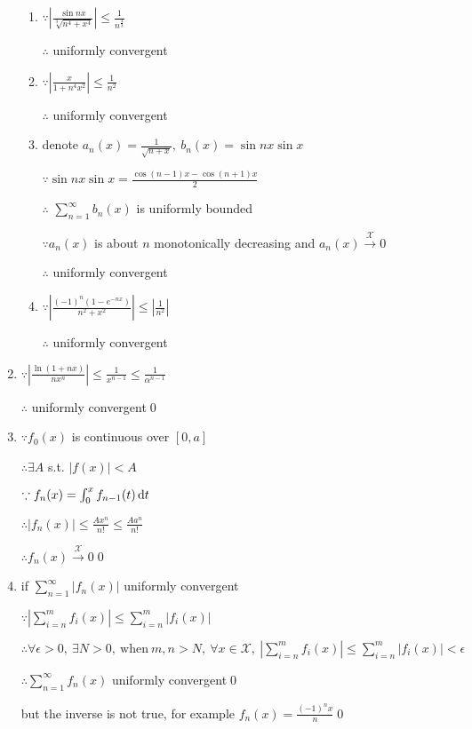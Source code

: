 \begin{enumerate}[1]
\begin{enumerate}[(1)]
        \item $\because \left|\frac{\sin n x}{\sqrt[3]{n^{4}+x^{4}}}\right| \leq \frac{1}{n^{\frac{4}{3}}}$
        \par $\therefore $ uniformly convergent

        \item $\because \left|\frac{x}{1+n^{4} x^{2}}\right| \leq \frac{1}{n^{2}}$
        \par $\therefore $ uniformly convergent

        \item denote $ a_{n}(x)=\frac{1}{\sqrt{n+x}},\ b_{n}(x)=\sin nx \sin x$
        \par  $\because \sin n x \sin x=\frac{\cos (n-1) x-\cos (n+1) x}{2}$ 
        \par $\therefore $ $\sum\limits_{n=1}^{\infty}b_n(x)$ is uniformly bounded
        \par $\because a_n(x)$ is about $n$ monotonically decreasing and $ a_{n}(x) \stackrel{\mathcal{X}}{\longrightarrow} 0$
        \par $\therefore $  uniformly convergent

        \item $\because \left|\frac{(-1)^{n}\left(1-e^{-n x}\right)}{n^{2}+x^{2}}\right| \leq\left|\frac{1}{n^{2}}\right|$
        \par $\therefore $ uniformly convergent
        \end{enumerate}

    \item $\because \left|\frac{\ln (1+n x)}{n x^{n}}\right| \leq \frac{1}{x^{n-1}} \leq \frac{1}{\alpha^{n-1}}$
    \par $\therefore $ uniformly convergent\qed

    \item   
    $\because f_0(x)$ is continuous over $[0,a]$
    \par $\therefore \exists A$ s.t. $|f(x)|<A$
    \par $\because f_{n}(x)=\int_{0}^{x} f_{n-1}(t)\dif t$ 
    \par $\therefore \left|f_{n}(x)\right| \leq \frac{A x^{n}}{n !} \leq \frac{A a^{n}}{n !}$
    \par $\therefore  f_n(x) \stackrel{\mathcal{X}}{\longrightarrow} 0$\qed

    \item 
    if $\sum \limits_{n=1}^{\infty} \left|f_{n}(x)\right|$ uniformly convergent
    \par $\because \left|\sum \limits_{i=n}^{m} f_{i}(x)\right| \leq \sum \limits_{i=n}^{m}\left|f_{i}(x)\right|$
    \par $\therefore  \forall \epsilon >0,\ \exists N>0,\ \text{when} \ m,n>N, \ \forall x \in \mathcal{X} ,\ \left|\sum \limits_{i=n}^{m} f_{i}(x)\right| \leq \sum \limits_{i=n}^{m}\left|f_{i}(x)\right|<\epsilon $
    \par $\therefore \sum \limits_{n=1}^{\infty} f_{n}(x)$ uniformly convergent\qed
    \par but the inverse is not true, for example $f_n(x) =  \frac{(-1)^{n} x}{n}$\qed
\end{enumerate}


